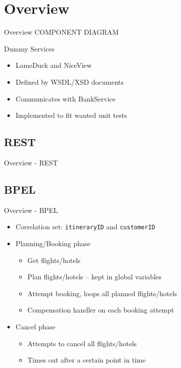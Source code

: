 
\section{Overview}
\begin{frame}{Overview}
COMPONENT DIAGRAM
\end{frame}


\begin{frame}{Dummy Services}
\begin{itemize}[<+->]
\item LameDuck and NiceView
\item Defined by WSDL/XSD documents
\item Communicates with BankService
\item Implemented to fit wanted unit tests
\end{itemize}
\end{frame}


\subsection{REST}
\begin{frame}{Overview - REST}

\end{frame}



\subsection{BPEL}
\begin{frame}{Overview - BPEL}
\begin{itemize}[<+->]
\item Correlation set: \texttt{itineraryID} and \texttt{customerID}

\medskip\item Planning/Booking phase
\begin{itemize}
\item Get flights/hotels
\item<3-> Plan flights/hotels -- kept in global variables
\item Attempt booking, loops all planned flights/hotels
\item Compensation handler on each booking attempt
\end{itemize}

\medskip\item Cancel phase
\begin{itemize}
\item Attempts to cancel all flights/hotels
\item<7-> Times out after a certain point in time
\end{itemize}

\end{itemize}
\end{frame}




